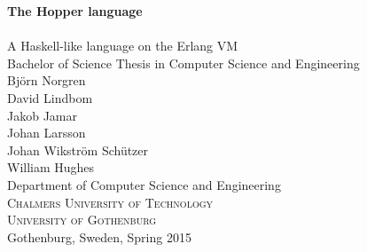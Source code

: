 
\begin{titlepage}
			
\addtolength{\voffset}{2cm}


\mbox{}
\vfill
\renewcommand{\familydefault}{\sfdefault} \normalfont %
\textbf{{\Huge	The Hopper language 	\\[0.2cm] 
				}} 	\\[0.5cm]
{\Large A Haskell-like language on the Erlang VM}\\[0.5cm]
Bachelor of Science Thesis in Computer Science and Engineering \\[0.5cm]

{\Large 
  Björn Norgren \\
  David Lindbom \\
  Jakob Jamar   \\
  Johan Larsson \\
  Johan Wikström Schützer \\
  William Hughes }\\[2.0cm]


Department of Computer Science and Engineering \\
\textsc{Chalmers University of Technology} \\
\textsc{University of Gothenburg} \\
Gothenburg, Sweden, Spring 2015

\renewcommand{\familydefault}{\rmdefault} \normalfont %
\end{titlepage}


\newpage
\restoregeometry
\thispagestyle{empty}
\mbox{}


